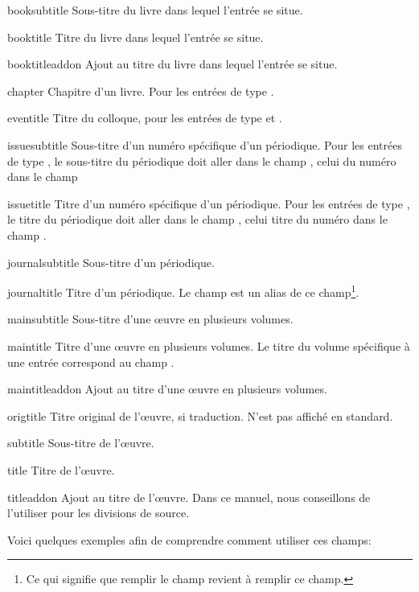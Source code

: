 \begin{choix}
	\item[booksubtitle]Sous-titre du livre dans lequel l'entrée se situe. 
   	\item[booktitle] Titre du livre dans lequel l'entrée se situe. 		
   	\item[booktitleaddon] Ajout au titre du livre dans lequel l'entrée se situe. 
   	\item[chapter] Chapitre d'un livre. Pour les entrées de type .	
   	\item[eventitle] Titre du colloque, pour les entrées de type  et .
   	\item[issuesubtitle] Sous-titre d'un numéro spécifique d'un périodique. 	Pour les entrées de type , le sous-titre du périodique doit aller dans le champ , celui du numéro dans le champ 		
   	\item[issuetitle] Titre d'un numéro spécifique d'un périodique. Pour les entrées de type , le titre du périodique doit aller dans le champ , celui titre du numéro dans le champ .		
   	\item[journalsubtitle] Sous-titre d'un périodique.							
   	\item[journaltitle] Titre d'un périodique. Le champ  est un alias de ce champ\footnote{Ce qui signifie que remplir le champ  revient à remplir ce champ.}.				
   	\item[mainsubtitle] Sous-titre d'une œuvre en plusieurs volumes.			
   	\item[maintitle] Titre d'une œuvre en plusieurs volumes. Le titre du volume spécifique à une entrée correspond au champ .						
   	\item[maintitleaddon]  Ajout au titre d'une œuvre en plusieurs volumes.		
   	\item[origtitle] Titre original de l'œuvre, si traduction. N'est pas affiché en standard. 	
   	\item[subtitle] Sous-titre de l'œuvre.									
   	\item[title] Titre de l'œuvre.									
   	\item[titleaddon] Ajout au titre de l'œuvre. Dans ce manuel, nous conseillons de l'utiliser pour les divisions de source.
\end{choix}

Voici quelques exemples afin de comprendre comment utiliser ces champs:

